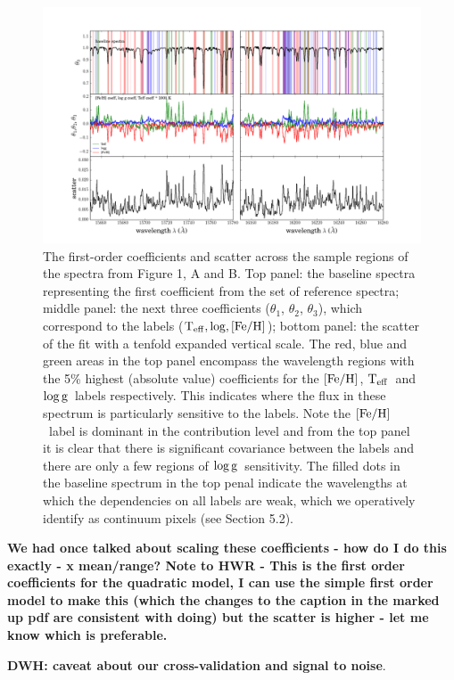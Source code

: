 \documentclass[12pt, preprint]{aastex}
\newcommand{\teff}{\mbox{$\rm T_{eff}$}}
\newcommand{\feh}{\mbox{$\rm [Fe/H]$}}
\newcommand{\logg}{\mbox{$\rm \log g$}}
\begin{document}
\begin{figure}[h!]
\centering
    \includegraphics[width=\hsize]{./plots/R1_continuum4.png}
  \caption{The first-order coefficients and scatter across the sample regions of the spectra from Figure 1, A and B. Top panel: the baseline spectra representing the first coefficient from the set of reference spectra; middle panel: the next three coefficients ($\theta_1$, $\theta_2$, $\theta_3$),  which correspond to the labels ($\teff, \log, \feh$); bottom panel: the scatter of the fit with a tenfold expanded vertical scale.  The red, blue and green areas in the top panel encompass the wavelength regions with the 5\% highest (absolute value) coefficients for the \feh, \teff\ and \logg\ labels respectively. This indicates where the flux in these spectrum is particularly sensitive to the labels.  Note the \feh\ label is dominant in the contribution level and from the top panel it is clear that there is significant covariance between the labels and there are only a few regions of \logg\ sensitivity. The filled dots in the baseline spectrum in the top penal indicate the wavelengths at which the dependencies on all labels are weak, which we operatively identify as continuum pixels (see Section 5.2).}
\label{fig:coeffs}
\end{figure}
\textbf{We had once talked about scaling these coefficients - how do I do this exactly - x mean/range? Note to HWR - This is the first order coefficients for the quadratic model, I can use the simple first order model to make this (which the changes to the caption in the marked up pdf are consistent with doing) but the scatter is higher - let me know which is preferable.}

\textbf{DWH: caveat about our cross-validation and signal to noise}. 
\end{document}
